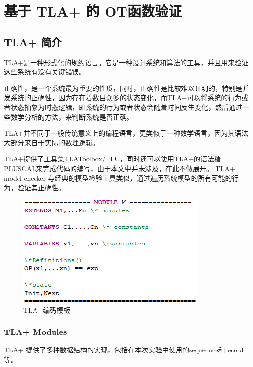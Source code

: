 \chapter{基于 TLA+ 的 OT函数验证} 
\section{TLA+ 简介}
\par TLA+是一种形式化的规约语言。它是一种设计系统和算法的工具，并且用来验证这些系统有没有关键错误。
\par 正确性，是一个系统最为重要的性质，同时，正确性是比较难以证明的，特别是并发系统的正确性，因为存在着数目众多的状态变化，而TLA+可以将系统的行为或者状态抽象为时态逻辑，即系统的行为或者状态会随着时间反生变化，然后通过一些数学分析的方法，来判断系统是否正确。

\par TLA+并不同于一般传统意义上的编程语言，更类似于一种数学语言，因为其语法大部分来自于实际的数理逻辑。
\par TLA+提供了工具集TLAToolbox/TLC，同时还可以使用TLA+的语法糖PLUSCAL来完成代码的编写，由于本文中并未涉及，在此不做展开。
TLA+ model checker 与经典的模型检验工具类似，通过遍历系统模型的所有可能的行为，验证其正确性。

\begin{figure}[H]
\centering
\includegraphics{figures/module.png}
\caption{TLA+编码模板}
\label{fig:graph}
\end{figure}

\subsection{TLA+ Modules}
TLA+ 提供了多种数据结构的实现，包括在本次实验中使用的sequecnce和record等。

